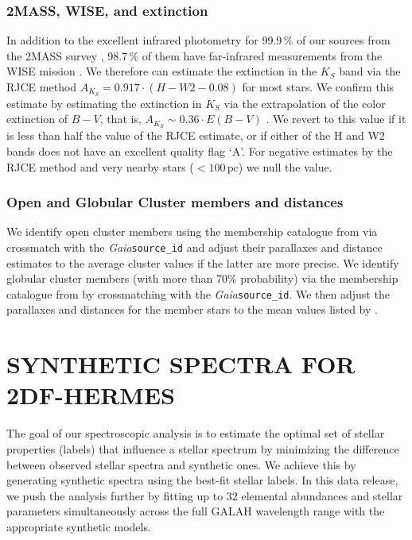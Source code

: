 \documentclass[
  journal=pasa,
  manuscript=research-paper, %
  year=2024,
  volume=37
]{cup-journal}
\newcommand{\Gaia}{\textit{Gaia}\xspace}
\begin{document}
\subsubsection{2MASS, WISE, and extinction}

In addition to the excellent infrared photometry for 99.9\,\% of our sources from the 2MASS survey \citep{Skrutskie2006}, 98.7\,\% of them have far-infrared measurements from the WISE mission \citep{Cutri2013}. We therefore can estimate the extinction in the $K_S$ band via the RJCE method \citep{Majewski2011} $A_{K_S}  = 0.917 \cdot \left( H - W2 - 0.08 \right)$ for most stars. We confirm this estimate by estimating the extinction in $K_S$ via the extrapolation of the color extinction of $B-V$, that is, $A_{K_S} \sim 0.36 \cdot E(B-V)$ \citep{Cardelli1989}. We revert to this value if it is less than half the value of the RJCE estimate, or if either of the H and W2 bands does not have an excellent quality flag `A'. For negative estimates by the RJCE method and very nearby stars ($<100\,\mathrm{pc}$) we null the value.

\subsubsection{Open and Globular Cluster members and distances} \label{sec:oc_gc}

We identify open cluster members using the membership catalogue from \citet{CantatGaudin2020} via crossmatch with the \Gaia \texttt{source\_id} and adjust their parallaxes and distance estimates to the average cluster values if the latter are more precise. We identify globular cluster members (with more than 70\% probability) via the membership catalogue from \citet{Vasiliev2021} by crossmatching with the \Gaia \texttt{source\_id}. We then adjust the parallaxes and distances for the member stars to the mean values listed by \citet{Baumgardt2021}.

\section{SYNTHETIC SPECTRA FOR 2DF-HERMES}
\label{sec:synthetic_spectra}

The goal of our spectroscopic analysis is to estimate the optimal set of stellar properties (labels) that influence a stellar spectrum by minimizing the difference between observed stellar spectra and synthetic ones. We achieve this by generating synthetic spectra using the best-fit stellar labels. In this data release, we push the analysis further by fitting up to 32 elemental abundances and stellar parameters simultaneously across the full GALAH wavelength range with the appropriate synthetic models.
\end{document}
